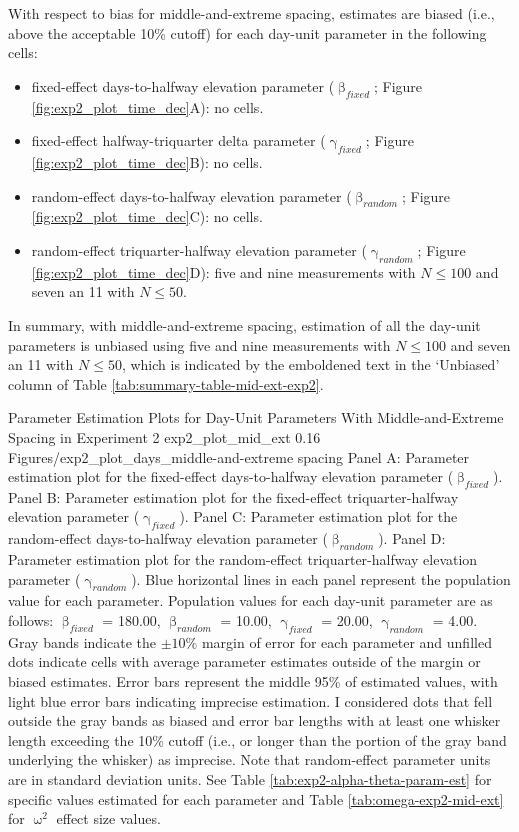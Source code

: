 \documentclass[
12pt, %
twoside,
english]{guelphthesis}
\theoremstyle{definition}
\theoremstyle{definition}
\theoremstyle{definition}
\theoremstyle{definition}
\theoremstyle{remark}
\begin{document}
With respect to bias for middle-and-extreme spacing, estimates are biased (i.e., above the acceptable 10\% cutoff) for each day-unit parameter in the following cells:
\begin{itemize}
\tightlist
\item
  fixed-effect days-to-halfway elevation parameter (\(\upbeta_{fixed}\); Figure \ref{fig:exp2_plot_time_dec}A): no cells.
\item
  fixed-effect halfway-triquarter delta parameter (\(\upgamma_{fixed}\); Figure \ref{fig:exp2_plot_time_dec}B): no cells.
\item
  random-effect days-to-halfway elevation parameter (\(\upbeta_{random}\); Figure \ref{fig:exp2_plot_time_dec}C): no cells.\\
\item
  random-effect triquarter-halfway elevation parameter (\(\upgamma_{random}\); Figure \ref{fig:exp2_plot_time_dec}D): five and nine measurements with \(N \le 100\) and seven an 11 with \(N \le 50\).
\end{itemize}
In summary, with middle-and-extreme spacing, estimation of all the day-unit parameters is unbiased using five and nine measurements with \(N \le 100\) and seven an 11 with \(N \le 50\), which is indicated by the emboldened text in the `Unbiased' column of Table \ref{tab:summary-table-mid-ext-exp2}.
\begin{apaFigure}
[portrait]
[samepage]
[-0.2cm]
{Parameter Estimation Plots for Day-Unit Parameters With Middle-and-Extreme Spacing in Experiment 2}
{exp2_plot_mid_ext}
{0.16}
{Figures/exp2_plot_days_middle-and-extreme spacing}
{Panel A: Parameter estimation plot for the fixed-effect days-to-halfway elevation parameter ($\upbeta_{fixed}$). Panel B: Parameter estimation plot for the fixed-effect triquarter-halfway elevation parameter ($\upgamma_{fixed}$). Panel C: Parameter estimation plot for the random-effect days-to-halfway elevation parameter ($\upbeta_{random}$). Panel D: Parameter estimation plot for the random-effect triquarter-halfway elevation parameter ($\upgamma_{random}$). Blue horizontal lines in each panel represent the population value for each parameter. Population values for each day-unit parameter are as follows: $\upbeta_{fixed}$ = 180.00, $\upbeta_{random}$ = 10.00, $\upgamma_{fixed}$ = 20.00, $\upgamma_{random}$ = 4.00. Gray bands indicate the $\pm 10\%$ margin of error for each parameter and unfilled dots indicate cells with average parameter estimates outside of the margin or biased estimates. Error bars represent the middle 95\% of estimated values, with light blue error bars indicating imprecise estimation. I considered dots that fell outside the gray bands as biased and error bar lengths with at least one whisker length exceeding the 10\% cutoff (i.e., or longer than the portion of the gray band underlying the whisker) as imprecise. Note that random-effect parameter units are in standard deviation units. See Table \ref{tab:exp2-alpha-theta-param-est} for specific values estimated for each parameter and Table \ref{tab:omega-exp2-mid-ext} for $\upomega^2$ effect size values.}
\end{apaFigure}
\end{document}
